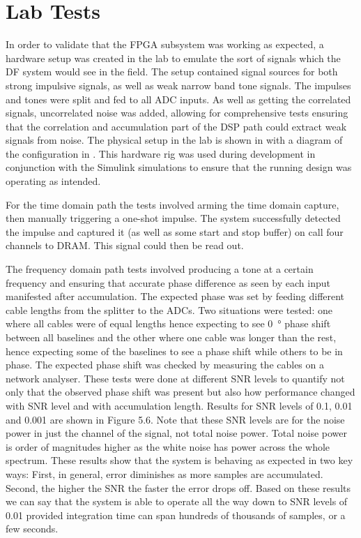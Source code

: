 \section{Lab Tests}
In order to validate that the FPGA subsystem was working as expected, a hardware setup was created in the lab to emulate the sort of signals which the DF system would see in the field. The setup contained signal sources for both strong impulsive signals, as well as weak narrow band tone signals. The impulses and tones were split and fed to all ADC inputs. As well as getting the correlated signals, uncorrelated noise was added, allowing for comprehensive tests ensuring that the correlation and accumulation part of the DSP path could extract weak signals from noise. The physical setup in the lab is shown in  with a diagram of the configuration in . This hardware rig was used during development in conjunction with the Simulink simulations to ensure that the running design was operating as intended. 

For the time domain path the tests involved arming the time domain capture, then manually triggering a one-shot impulse. The system successfully detected the impulse and captured it (as well as some start and stop buffer) on call four channels to DRAM. This signal could then be read out.

The frequency domain path tests involved producing a tone at a certain frequency and ensuring that accurate phase difference as seen by each input manifested after accumulation. The expected phase was set by feeding different cable lengths from the splitter to the ADCs. Two situations were tested: one where all cables were of equal lengths hence expecting to see \SI{0}{\degree} phase shift between all baselines and the other where one cable was longer than the rest, hence expecting some of the baselines to see a phase shift while others to be in phase. The expected phase shift was checked by measuring the cables on a network analyser. These tests were done at different SNR levels to quantify not only that the observed phase shift was present but also how performance changed with SNR level and with accumulation length. Results for SNR levels of 0.1, 0.01 and 0.001 are shown in Figure 5.6. Note that these SNR levels are for the noise power in just the channel of the signal, not total noise power. Total noise power is order of magnitudes higher as the white noise has power across the whole spectrum. These results show that the system is behaving as expected in two key ways: First, in general, error diminishes as more samples are accumulated. Second, the higher the SNR the faster the error drops off. Based on these results we can say that the system is able to operate all the way down to SNR levels of 0.01 provided integration time can span hundreds of thousands of samples, or a few seconds.

